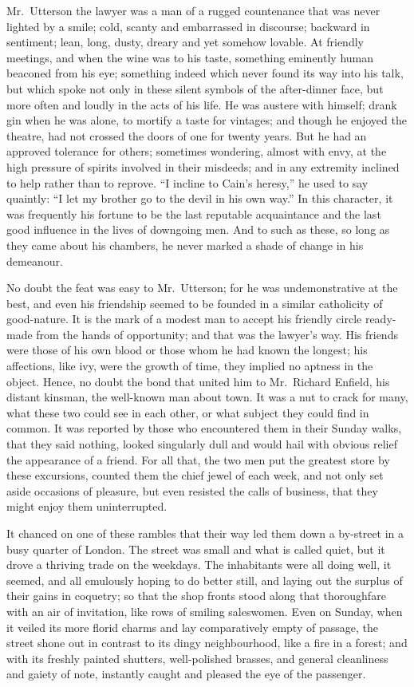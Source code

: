 \documentclass[12pt,openright]{book}
\begin{document}
Mr. Utterson the lawyer was a man of a rugged countenance that was never lighted by a smile; cold, scanty and embarrassed in discourse; backward in sentiment; lean, long, dusty, dreary and yet somehow lovable. At friendly meetings, and when the wine was to his taste, something eminently human beaconed from his eye; something indeed which never found its way into his talk, but which spoke not only in these silent symbols of the after-dinner face, but more often and loudly in the acts of his life. He was austere with himself; drank gin when he was alone, to mortify a taste for vintages; and though he enjoyed the theatre, had not crossed the doors of one for twenty years. But he had an approved tolerance for others; sometimes wondering, almost with envy, at the high pressure of spirits involved in their misdeeds; and in any extremity inclined to help rather than to reprove. “I incline to Cain’s heresy,” he used to say quaintly: “I let my brother go to the devil in his own way.” In this character, it was frequently his fortune to be the last reputable acquaintance and the last good influence in the lives of downgoing men. And to such as these, so long as they came about his chambers, he never marked a shade of change in his demeanour.

No doubt the feat was easy to Mr. Utterson; for he was undemonstrative at the best, and even his friendship seemed to be founded in a similar catholicity of good-nature. It is the mark of a modest man to accept his friendly circle ready-made from the hands of opportunity; and that was the lawyer’s way. His friends were those of his own blood or those whom he had known the longest; his affections, like ivy, were the growth of time, they implied no aptness in the object. Hence, no doubt the bond that united him to Mr. Richard Enfield, his distant kinsman, the well-known man about town. It was a nut to crack for many, what these two could see in each other, or what subject they could find in common. It was reported by those who encountered them in their Sunday walks, that they said nothing, looked singularly dull and would hail with obvious relief the appearance of a friend. For all that, the two men put the greatest store by these excursions, counted them the chief jewel of each week, and not only set aside occasions of pleasure, but even resisted the calls of business, that they might enjoy them uninterrupted.

It chanced on one of these rambles that their way led them down a by-street in a busy quarter of London. The street was small and what is called quiet, but it drove a thriving trade on the weekdays. The inhabitants were all doing well, it seemed, and all emulously hoping to do better still, and laying out the surplus of their gains in coquetry; so that the shop fronts stood along that thoroughfare with an air of invitation, like rows of smiling saleswomen. Even on Sunday, when it veiled its more florid charms and lay comparatively empty of passage, the street shone out in contrast to its dingy neighbourhood, like a fire in a forest; and with its freshly painted shutters, well-polished brasses, and general cleanliness and gaiety of note, instantly caught and pleased the eye of the passenger.
\end{document}
